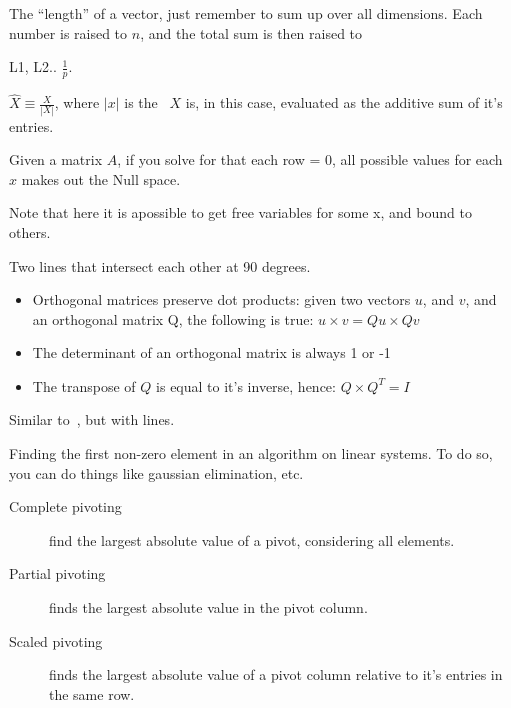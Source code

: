 \begin{definition}[Norm]
    The ``length'' of a vector, just remember to sum up over all dimensions.
    Each number is raised to $n$, and the total sum is then raised to

    L1, L2..
$\frac{1}{p}$.  \end{definition}

\begin{definition}
    $ \hat{X} \equiv \frac{X}{|X|} $, where $|x|$ is the~
    $X$ is, in this case, evaluated as the additive sum of it's entries.
\end{definition}

\begin{definition}
    Given a matrix $A$, if you solve for that each row = 0,
    all possible values for each $x$ makes out the Null space.

    Note that here it is apossible to get free variables for 
    some x, and bound to others.

\end{definition}



\begin{definition}[Orthogonal]\label{orthogonal}
    Two lines that intersect each other at 90 degrees.\\
    \begin{itemize}
        \item Orthogonal matrices preserve dot products:
        given two vectors $u$, and $v$, and an orthogonal matrix Q,
        the following is true:
        $u \times v = Qu \times Qv$
        \item The determinant of an orthogonal matrix is always 1 or -1
        \item The transpose of $Q$ is equal to it's inverse, hence:
            $Q \times Q^{T} = I$
    \end{itemize}
\end{definition}

\begin{definition}[Perpendicular]
    Similar to~, but with lines.
\end{definition}

\begin{definition}[Pivoting]
    Finding the first non-zero element in an algorithm on linear systems.
    To do so, you can do things like gaussian elimination, etc.
    \begin{description}
        \item[Complete pivoting] find the largest absolute value of a pivot,
            considering all elements.
        \item[Partial pivoting] finds the largest absolute value in the pivot
            column.
        \item[Scaled pivoting] finds the largest absolute value of a pivot
            column relative to it's entries in the same row.
    \end{description}
\end{definition}

